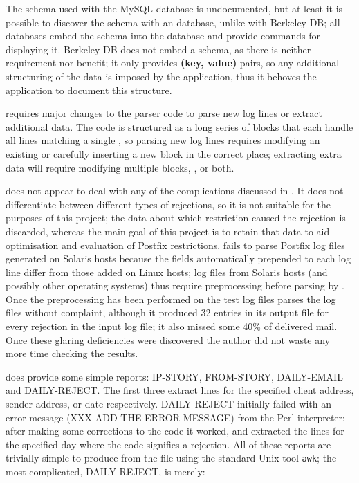 The schema used with the MySQL database is undocumented, but at least it is
possible to discover the schema with an \SQL{} database, unlike with
Berkeley DB\@; all \SQL{} databases embed the schema into the database and
provide commands for displaying it.  Berkeley DB does not embed a schema,
as there is neither requirement nor benefit; it only provides \textbf{(key,
value)} pairs, so any additional structuring of the data is imposed by the
application, thus it behoves the application to document this structure.

\LMA{} requires major changes to the parser code to parse new log lines or
extract additional data.  The code is structured as a long series of blocks
that each handle all lines matching a single \regex{}, so parsing new log
lines requires modifying an existing \regex{} or carefully inserting a new
block in the correct place; extracting extra data will require modifying
multiple blocks, \regexes{}, or both.

\LMA{} does not appear to deal with any of the complications discussed in
.  It does not differentiate between different
types of rejections, so it is not suitable for the purposes of this
project; the data about which restriction caused the rejection is
discarded, whereas the main goal of this project is to retain that data to
aid optimisation and evaluation of Postfix restrictions.  \LMA{} fails to
parse Postfix log files generated on Solaris hosts because the fields
automatically prepended to each log line differ from those added on Linux
hosts; log files from Solaris hosts (and possibly other operating systems)
thus require preprocessing before parsing by \LMA{}.  Once the
preprocessing has been performed on the \numberOFlogFILES{} test log files
\LMA{} parses the log files without complaint, although it produced 32
entries in its output file for every rejection in the input log file; it
also missed some 40\% of delivered mail.  Once these glaring deficiencies
were discovered the author did not waste any more time checking the
results.

\LMA{} does provide some simple reports: IP-STORY, FROM-STORY, DAILY-EMAIL
and DAILY-REJECT\@.  The first three extract \CSV{} lines for the specified
client \IP{} address, sender address, or date respectively.  DAILY-REJECT
initially failed with an error message (XXX ADD THE ERROR MESSAGE) from the
Perl interpreter; after making some corrections to the code it worked, and
extracted the \CSV{} lines for the specified day where the \SMTP{} code
signifies a rejection.  All of these reports are trivially simple to
produce from the \CSV{} file using the standard Unix tool \texttt{awk}; the
most complicated, DAILY-REJECT, is merely:


